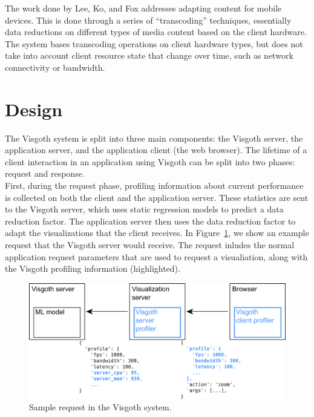 The work done by Lee, Ko, and Fox \cite{adapting-heterogeneous} addresses
adapting content for mobile devices.  This is done through a series of
``transcoding'' techniques, essentially data reductions on different types of
media content based on the client hardware.  The system bases transcoding
operations on client hardware types, but does not take into account client
resource state that change over time, such as network connectivity or
bandwidth.\\

\section{Design}\label{visgoth-ch:design}

The Visgoth system is split into three main components: the Visgoth server, the
application server, and the application client (the web browser). The lifetime
of a client interaction in an application using Visgoth can be split into two
phases: request and response. \\

First, during the request phase, profiling information about current
performance is collected on both the client and the application server. These
statistics are sent to the Visgoth server, which uses static regression models
to predict a data reduction factor. The application server then uses the data
reduction factor to adapt the visualizations that the client receives. In
Figure~\ref{fig:system-request}, we show an example request that the Visgoth
server would receive. The request inludes the normal application request
parameters that are used to request a visualiation, along with the Visgoth
profiling information (highlighted).\\

\begin{figure}[h]
\begin{center}
\includegraphics[scale=0.5]{./img/system-request.png}
\caption{Sample request in the Visgoth system.}
\label{fig:system-request}
\end{center}
\end{figure}

